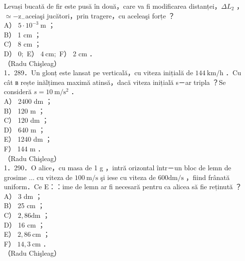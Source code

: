 {Levași bucată de fir este pusă în două，care va fi modificarea distanței，$\Delta L_{2}$ ， $\simeq-\mathrm{z}_{-}$aceiaşi jucători，prin tragere，cu aceleaşi forțe ？\\
A） $5 \cdot 10^{-3} \mathrm{~m}$ ；\\
B） 1 cm ；\\
C） 8 cm ；\\
D） $0 ;$ E） $4 \mathrm{~cm} ;$ F） 2 cm ．\\
（Radu Chişleag）\\
1．289．Un glonț este lansat pe verticală，cu viteza inițială de $144 \mathrm{~km} / \mathrm{h}$ ．Cu cât в rește inălțimea maximă atinsă，dacă viteza inițială s－ar tripla ？Se consideră $s=10 \mathrm{~m} / \mathrm{s}^{2}$ ．\\
A） 2400 dm ；\\
B） 120 m ；\\
C） 120 dm ；\\
D） 640 m ；\\
E） 1240 dm ；\\
F） 144 m ．\\
（Radu Chişleag）\\
1．290．O alice，cu masa de 1 g ，intră orizontal într－un bloc de lemn de grosime $\ldots$ cu viteza de $100 \mathrm{~m} / \mathrm{s}$ şi iese cu viteza de $600 \mathrm{dm} / \mathrm{s}$ ，fiind frânată uniform．Ce E：：ime de lemn ar fi necesară pentru ca alicea să fie reținută ？\\
A） 3 dm ；\\
B） 25 cm ；\\
C） $2,86 \mathrm{dm}$ ；\\
D） 16 cm ；\\
E） $2,86 \mathrm{~cm}$ ；\\
F） $14,3 \mathrm{~cm}$ ．\\
（Radu Chişleag）

}

